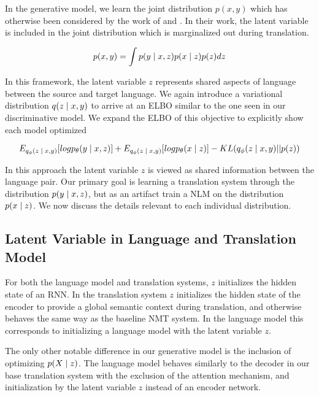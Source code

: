 In the generative model, we learn the joint distribution $p(x, y)$ which has otherwise been considered by the work of \citet{eikema2018AEVNMT} and \citet{harshil2018GNMT}. In their work, the latent variable is included in the joint distribution which is marginalized out during translation.

\begin{equation}
	p(x, y) = \int p(y \; | \;{x, z})  p(x\; | \;{z}) p(z) dz
\end{equation}

In this framework, the latent variable $z$ represents shared aspects of language between the source and target language. We again introduce a variational distribution $q( z\; | \;{x, y})$ to arrive at an ELBO similar to the one seen in our discriminative model. We expand the \ac{ELBO} of this objective to explicitly show each model optimized

\begin{equation}
E_{q_{\phi}(z \; | \;{x,y})} [ log p_{\theta}(y \; | \;{x, z})] +
E_{q_{\phi}(z \; | \;{x,y})} [ log p_{\theta}(x \; | \;{z})] -
	KL(q_{\phi}(z \; | \;{x,y}) || p(z))
\end{equation}

In this approach the latent variable $z$ is viewed as shared information between the language pair. Our primary goal is learning a translation system through the distribution $p(y \; | \;{x, z})$, but  as an artifact train a \ac{NLM} on the distribution $p(x \; | \;{z})$. We now discuss the details relevant to each individual distribution. 

\subsection{Latent Variable in Language and Translation Model}


For both the language model and translation systems, $z$ initializes the hidden state of an \ac{RNN}. In the translation system $z$  initializes the hidden state of the encoder to provide a global semantic context during translation, and otherwise behaves the same way as the baseline \ac{NMT} system. In the language model this corresponds to initializing a language model with the latent variable $z$. 

The only other notable difference in our generative model is the inclusion of optimizing $p(X \; | \;{z})$. The language model behaves similarly to the decoder in our base translation system with the exclusion of the attention mechanism, and initialization by the latent variable $z$ instead of an encoder network. 

